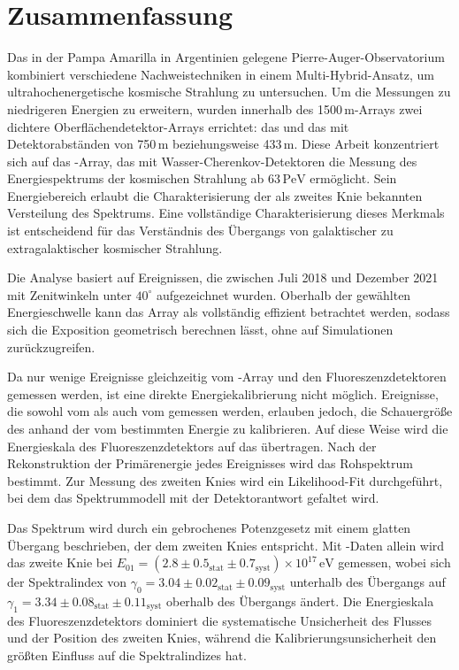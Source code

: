 
\chapter*{Zusammenfassung}
\vspace{-2\baselineskip}

Das in der Pampa Amarilla in Argentinien gelegene Pierre-Auger-Observatorium kombiniert verschiedene Nachweistechniken in einem Multi-Hybrid-Ansatz, um ultrahochenergetische kosmische Strahlung zu untersuchen.
Um die Messungen zu niedrigeren Energien zu erweitern, wurden innerhalb des 1500\,m-Arrays zwei dichtere Oberflächendetektor-Arrays errichtet: das  und das  mit Detektorabständen von 750\,m beziehungsweise 433\,m.
Diese Arbeit konzentriert sich auf das -Array, das mit Wasser-Cherenkov-Detektoren die Messung des Energiespektrums der kosmischen Strahlung ab $63\,\mathrm{PeV}$ ermöglicht.
Sein Energiebereich erlaubt die Charakterisierung der als zweites Knie bekannten Versteilung des Spektrums.
Eine vollständige Charakterisierung dieses Merkmals ist entscheidend für das Verständnis des Übergangs von galaktischer zu extragalaktischer kosmischer Strahlung.

Die Analyse basiert auf \SDFourThreeThreeNEvents{} Ereignissen, die zwischen Juli 2018 und Dezember 2021 mit Zenitwinkeln unter $40^\circ$ aufgezeichnet wurden.
Oberhalb der gewählten Energieschwelle kann das Array als vollständig effizient betrachtet werden, sodass sich die Exposition geometrisch berechnen lässt, ohne auf Simulationen zurückzugreifen.

Da nur wenige Ereignisse gleichzeitig vom -Array und den Fluoreszenzdetektoren gemessen werden, ist eine direkte Energiekalibrierung nicht möglich.
Ereignisse, die sowohl vom  als auch vom  gemessen werden, erlauben jedoch, die Schauergröße des  anhand der vom  bestimmten Energie zu kalibrieren.
Auf diese Weise wird die Energieskala des Fluoreszenzdetektors auf das  übertragen.
Nach der Rekonstruktion der Primärenergie jedes Ereignisses wird das Rohspektrum bestimmt.
Zur Messung des zweiten Knies wird ein Likelihood-Fit durchgeführt, bei dem das Spektrummodell mit der Detektorantwort gefaltet wird.

Das Spektrum wird durch ein gebrochenes Potenzgesetz mit einem glatten Übergang beschrieben, der dem zweiten Knies entspricht.
Mit -Daten allein wird das zweite Knie bei $E_{01}=(2.8\pm0.5_{\mathrm{stat}}\pm0.7_{\mathrm{syst}})\times10^{17}\,\mathrm{eV}$ gemessen, wobei sich der Spektralindex von $\gamma_0=3.04\pm0.02_{\mathrm{stat}}\pm0.09_{\mathrm{syst}}$ unterhalb des Übergangs auf $\gamma_1=3.34\pm0.08_{\mathrm{stat}}\pm0.11_{\mathrm{syst}}$ oberhalb des Übergangs ändert.
Die Energieskala des Fluoreszenzdetektors dominiert die systematische Unsicherheit des Flusses und der Position des zweiten Knies, während die Kalibrierungsunsicherheit den größten Einfluss auf die Spektralindizes hat.

